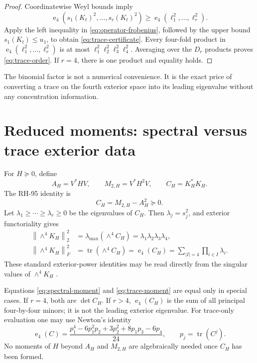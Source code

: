 \documentclass[11pt]{article}
\theoremstyle{definition}
\theoremstyle{remark}
\newcommand{\norm}[1]{\left\lVert#1\right\rVert}
\newcommand{\tr}{\operatorname{tr}}
\newcommand{\e}{\operatorname{e}}
\begin{document}
\begin{proof}
Coordinatewise Weyl bounds imply
\[
 \e_4(s_1(K_t)^2,\ldots,s_r(K_t)^2)
 \ge \e_4(\ell_1^2,\ldots,\ell_r^2).
\]
Apply the left inequality in \eqref{eq:operator-frobenius}, followed by the
upper bound $s_1(K_t)\le u_1$, to obtain \eqref{eq:trace-certificate}.
Every four-fold product in $\e_4(\ell_1^2,\ldots,\ell_r^2)$ is at most
$\ell_1^2\ell_2^2\ell_3^2\ell_4^2$.  Averaging over the $D_r$ products proves
\eqref{eq:trace-order}.  If $r=4$, there is one product and equality holds.
\end{proof}

The binomial factor is not a numerical convenience.  It is the exact price
of converting a trace on the fourth exterior space into its leading
eigenvalue without any concentration information.

\section{Reduced moments: spectral versus trace exterior data}
\label{sec:moments}

For $H\succeq0$, define
\begin{equation}
 A_H=V^*HV,
 \qquad M_{2,H}=V^*H^2V,
 \qquad C_H=K_H^*K_H.
\end{equation}
The RH-95 identity is
\begin{equation}
 C_H=M_{2,H}-A_H^2\succeq0.
 \label{eq:moment}
\end{equation}
Let $\lambda_1\ge\cdots\ge\lambda_r\ge0$ be the eigenvalues of $C_H$.
Then $\lambda_j=s_j^2$, and exterior functoriality gives
\begin{align}
 \norm{\wedge^4K_H}_2^2
 &=\lambda_{\max}(\wedge^4C_H)
 =\lambda_1\lambda_2\lambda_3\lambda_4,
 \label{eq:spectral-moment}\\
 \norm{\wedge^4K_H}_F^2
 &=\tr(\wedge^4C_H)
 =\e_4(C_H)
 =\sum_{|I|=4}\prod_{i\in I}\lambda_i.
 \label{eq:trace-moment}
\end{align}
These standard exterior-power identities may be read directly from the
singular values of $\wedge^4K_H$ \citep{HornJohnson1991}.

Equations \eqref{eq:spectral-moment} and \eqref{eq:trace-moment} are equal
only in special cases.  If $r=4$, both are $\det C_H$.  If $r>4$,
$\e_4(C_H)$ is the sum of all principal four-by-four minors; it is not the
leading exterior eigenvalue.  For trace-only evaluation one may use Newton's
identity
\begin{equation}
 \e_4(C)=\frac{p_1^4-6p_1^2p_2+3p_2^2+8p_1p_3-6p_4}{24},
 \qquad p_j=\tr(C^j).
 \label{eq:newton}
\end{equation}
No moments of $H$ beyond $A_H$ and $M_{2,H}$ are algebraically needed once
$C_H$ has been formed.
\end{document}
